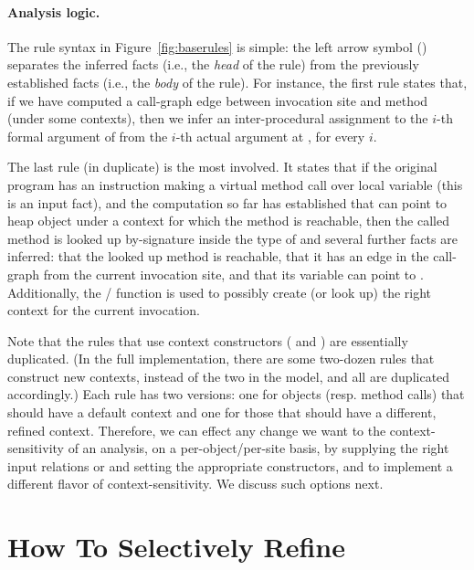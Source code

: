 \paragraph{Analysis logic.}
  The rule syntax in Figure~\ref{fig:baserules} is simple: the
  left arrow symbol () separates the inferred facts (i.e.,
  the \emph{head} of the rule) from the previously established facts
  (i.e., the \emph{body} of the rule). For instance, the first rule
  states that, if we have computed a call-graph edge between
  invocation site  and method  (under some
  contexts), then we infer an inter-procedural assignment to the
  $i$-th formal argument of  from the $i$-th actual
  argument at , for every $i$.

  The last rule (in duplicate) is the most involved. It states that if
  the original program has an instruction making a virtual method call
  over local variable  (this is an input fact), and the
  computation so far has established that  can point to
  heap object  under a context for which the method is
  reachable, then the called method is looked up by-signature inside
  the type of  and several further facts are inferred: that
  the looked up method is reachable, that it has an edge in the
  call-graph from the current invocation site, and that its
   variable can point to . Additionally, the
  / function is used to possibly
  create (or look up) the right context for the current invocation.

  Note that the rules that use context constructors (
  and ) are essentially duplicated. (In the full
  implementation, there are some two-dozen rules that construct new
  contexts, instead of the two in the model, and all are duplicated
  accordingly.) Each rule has two versions: one for objects
  (resp. method calls) that should have a default context and one for
  those that should have a different, refined context. Therefore, we
  can effect any change we want to the context-sensitivity of an
  analysis, on a per-object/per-site basis, by supplying the right
  input relations  or 
  and setting the appropriate constructors, 
  and  to implement a different flavor of
  context-sensitivity. We discuss such options next.


\section{How To Selectively Refine}
\label{heuristics}

